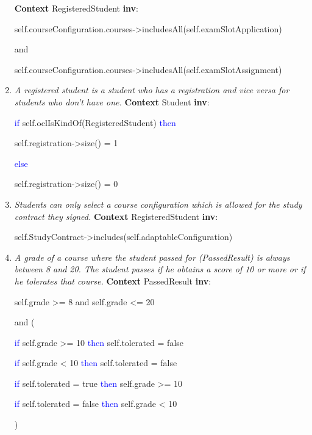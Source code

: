\begin{enumerate}
	\npar \textbf{Context} RegisteredStudent \textbf{inv}:
	\par \hspace*{5 mm} self.courseConfiguration.courses->includesAll(self.examSlotApplication)
	\par \hspace*{5 mm} and
	\par \hspace*{5 mm} self.courseConfiguration.courses->includesAll(self.examSlotAssignment)
	
	\item  \emph{A registered student is a student who has a registration and vice
	versa for students who don't have one.}
	\npar \textbf{Context} Student \textbf{inv}:
	\par \hspace*{5 mm} \textcolor{Blue}{if}
	self.oclIsKindOf(RegisteredStudent) \textcolor{Blue}{then}
	\par \hspace*{10 mm} self.registration->size() = 1
	\par \hspace*{5 mm} \textcolor{Blue}{else}
	\par \hspace*{10 mm} self.registration->size() = 0
	
	\item \emph{Students can only select a course configuration which is allowed
	for the study contract they signed.}
	\npar \textbf{Context} RegisteredStudent \textbf{inv}:
	\par \hspace*{5 mm} self.StudyContract->includes(self.adaptableConfiguration)
	
	\item \emph{A grade of a course where the student passed for (PassedResult) is
	always between 8 and 20. The student passes if he obtains a score of 10 or
	more or if he tolerates that course.}
	\npar \textbf{Context} PassedResult \textbf{inv}:
	\par \hspace*{5 mm} self.grade >= 8 and self.grade <= 20
	\par \hspace*{5 mm} and (
	\par \hspace*{10 mm} \textcolor{Blue}{if} self.grade >= 10
	\textcolor{Blue}{then} self.tolerated = false 
	\par \hspace*{10 mm} \textcolor{Blue}{if} self.grade < 10 \textcolor{Blue}{then}
	self.tolerated = false 
	\par \hspace*{10 mm} \textcolor{Blue}{if} self.tolerated = true \textcolor{Blue}{then} self.grade >= 10
	\par \hspace*{10 mm} \textcolor{Blue}{if} self.tolerated = false \textcolor{Blue}{then} self.grade < 10
	\par \hspace*{5 mm} )
	

\end{enumerate}
